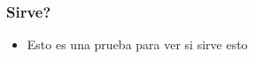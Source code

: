 \begin{frame}[allowframebreaks]

  \frametitle{Sirve?}

  \begin{itemize}
    \item Esto es una prueba para ver si sirve esto
  \end{itemize}

\end{frame}
